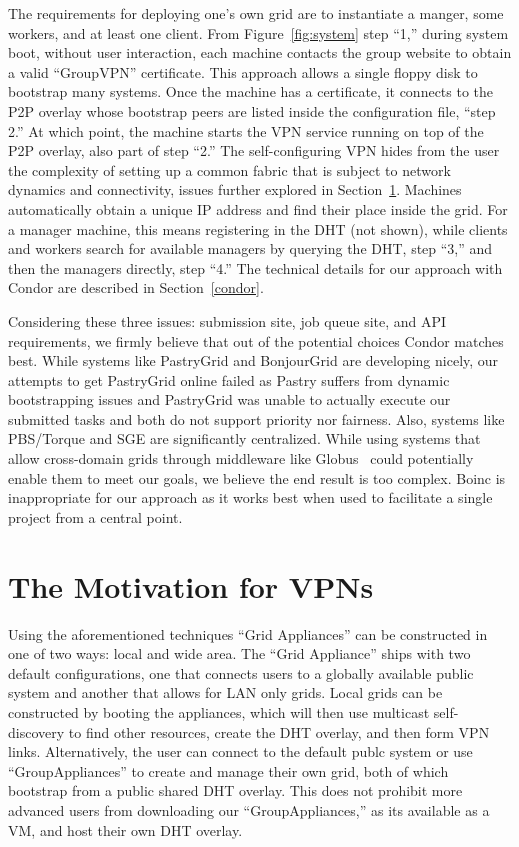 \documentclass[conference]{IEEEtran}
\begin{document}
The requirements for deploying one's own grid are to instantiate a manger, some
workers, and at least one client.  From Figure~\ref{fig:system} step ``1,''
during system boot, without user interaction, each machine contacts the group
website to obtain a valid ``GroupVPN'' certificate.  This approach allows a
single floppy disk to bootstrap many systems.  Once the machine has a
certificate, it connects to the P2P overlay whose bootstrap peers are listed
inside the configuration file, ``step 2.''  At which point, the machine starts
the VPN service running on top of the P2P overlay, also part of step ``2.'' The
self-configuring VPN hides from the user the complexity of setting up a common
fabric that is subject to network dynamics and connectivity, issues further
explored in Section~\ref{vpns}.  Machines automatically obtain a unique IP
address and find their place inside the grid.  For a manager machine, this
means registering in the DHT (not shown), while clients and workers search for
available managers by querying the DHT, step ``3,'' and then the managers
directly, step ``4.''  The technical details for our approach with Condor are
described in Section~\ref{condor}.

Considering these three issues:  submission site, job queue site, and API
requirements, we firmly believe that out of the potential choices Condor
matches best.  While systems like PastryGrid and BonjourGrid are developing
nicely, our attempts to get PastryGrid online failed as Pastry suffers from
dynamic bootstrapping issues and PastryGrid was unable to actually execute our
submitted tasks and both do not support priority nor fairness.  Also, systems
like PBS/Torque and SGE are significantly centralized.  While using systems
that allow cross-domain grids through middleware like Globus~\cite{globus}
could potentially enable them to meet our goals, we believe the end result is
too complex.  Boinc is inappropriate for our approach as it works best when
used to facilitate a single project from a central point.

\section{The Motivation for VPNs}
\label{vpns}

Using the aforementioned techniques ``Grid Appliances'' can be constructed in
one of two ways: local and wide area.  The ``Grid Appliance'' ships with two
default configurations, one that connects users to a globally available public
system and another that allows for LAN only grids.  Local grids can be
constructed by booting the appliances, which will then use multicast
self-discovery to find other resources, create the DHT overlay, and then form
VPN links.  Alternatively, the user can connect to the default publc system or
use ``GroupAppliances'' to create and manage their own grid, both of which
bootstrap from a public shared DHT overlay.  This does not prohibit more
advanced users from downloading our ``GroupAppliances,'' as its available as a
VM, and host their own DHT overlay.
\end{document}

